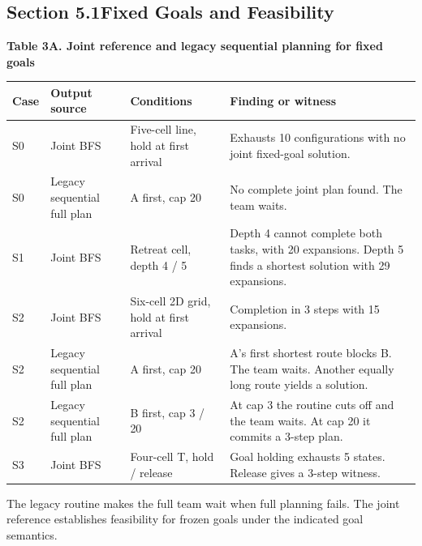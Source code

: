 \documentclass{article}
\begin{document}
\subsection*{Section 5.1\quad Fixed Goals and Feasibility}\hypertarget{sup:5.1}{}
\par\medskip\noindent\begin{minipage}{\linewidth}
\small\hypertarget{display:Table3A}{}\textbf{Table 3A. Joint reference and legacy sequential planning for fixed goals}\par\smallskip
\setlength{\tabcolsep}{4pt}\renewcommand{\arraystretch}{1.12}
\begin{tabular}{@{}>{\raggedright\arraybackslash}p{}>{\raggedright\arraybackslash}p{}>{\raggedright\arraybackslash}p{}>{\raggedright\arraybackslash}p{}@{}}
\toprule
\textbf{Case} & \textbf{Output source} & \textbf{Conditions} & \textbf{Finding or witness} \\
\midrule
S0 & Joint BFS & Five-cell line, hold at first arrival & Exhausts 10 configurations with no joint fixed-goal solution. \\
S0 & Legacy sequential full plan & A first, cap 20 & No complete joint plan found. The team waits. \\
S1 & Joint BFS & Retreat cell, depth 4 / 5 & Depth 4 cannot complete both tasks, with 20 expansions. Depth 5 finds a shortest solution with 29 expansions. \\
S2 & Joint BFS & Six-cell 2D grid, hold at first arrival & Completion in 3 steps with 15 expansions. \\
S2 & Legacy sequential full plan & A first, cap 20 & A's first shortest route blocks B. The team waits. Another equally long route yields a solution. \\
S2 & Legacy sequential full plan & B first, cap 3 / 20 & At cap 3 the routine cuts off and the team waits. At cap 20 it commits a 3-step plan. \\
S3 & Joint BFS & Four-cell T, hold / release & Goal holding exhausts 5 states. Release gives a 3-step witness. \\
\bottomrule
\end{tabular}
\par\smallskip The legacy routine makes the full team wait when full planning fails. The joint reference establishes feasibility for frozen goals under the indicated goal semantics.
\end{minipage}\par\medskip
\end{document}
